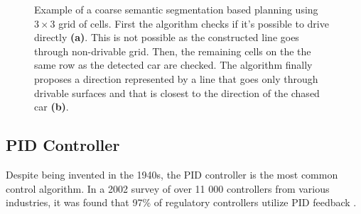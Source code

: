 \documentclass{ctuthesis/ctuthesis}
\begin{document}
\begin{figure}[]
    \centering
    \qquad
    \caption{Example of a coarse semantic segmentation based planning using $3\times 3$ grid of cells. First the algorithm checks if it's possible to drive directly \textbf{(a)}. This is not possible as the constructed line goes through non-drivable grid. Then, the remaining cells on the the same row as the detected car are checked. The algorithm finally proposes a direction represented by a line that goes only through drivable surfaces and that is closest to the direction of the chased car \textbf{(b)}.}%
    \label{fig:segmentation_planning}%
\end{figure}

\subsection{PID Controller}
Despite being invented in the 1940s, the PID controller is the most common control algorithm. In a 2002 survey of over 11 000 controllers from various industries, it was found that 97\% of regulatory controllers utilize PID feedback \cite{PID-usage}. 
\end{document}
